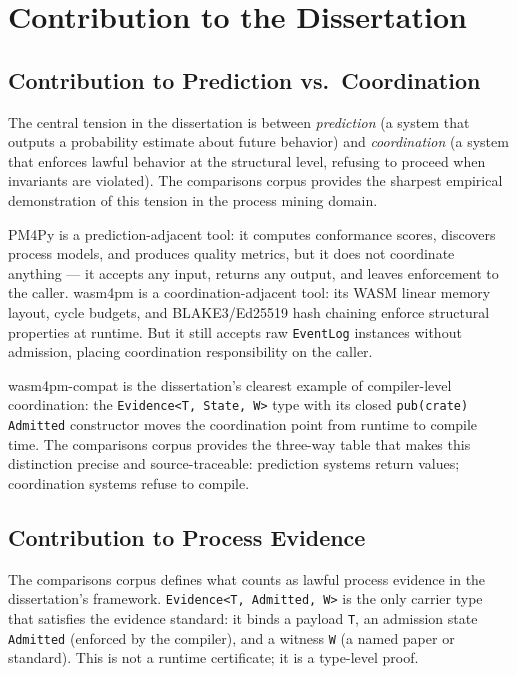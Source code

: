 
\section{Contribution to the Dissertation}
\label{sec:comparisons-contribution}

\subsection{Contribution to Prediction vs.~Coordination}
\label{sec:comparisons-contribution-prediction}

The central tension in the dissertation is between \emph{prediction} (a system
that outputs a probability estimate about future behavior) and
\emph{coordination} (a system that enforces lawful behavior at the structural
level, refusing to proceed when invariants are violated). The comparisons corpus
provides the sharpest empirical demonstration of this tension in the process
mining domain.

PM4Py is a prediction-adjacent tool: it computes conformance scores, discovers
process models, and produces quality metrics, but it does not coordinate anything
--- it accepts any input, returns any output, and leaves enforcement to the caller.
wasm4pm is a coordination-adjacent tool: its WASM linear memory layout, cycle
budgets, and BLAKE3/Ed25519 hash chaining enforce structural properties at
runtime. But it still accepts raw \texttt{EventLog} instances without admission,
placing coordination responsibility on the caller.

wasm4pm-compat is the dissertation's clearest example of compiler-level
coordination: the \texttt{Evidence<T, State, W>} type with its closed
\texttt{pub(crate)} \texttt{Admitted} constructor moves the coordination point
from runtime to compile time. The comparisons corpus provides the three-way
table that makes this distinction precise and source-traceable: prediction
systems return values; coordination systems refuse to compile.

\subsection{Contribution to Process Evidence}
\label{sec:comparisons-contribution-evidence}

The comparisons corpus defines what counts as lawful process evidence in the
dissertation's framework. \texttt{Evidence<T, Admitted, W>} is the only carrier
type that satisfies the evidence standard: it binds a payload \texttt{T}, an
admission state \texttt{Admitted} (enforced by the compiler), and a witness
\texttt{W} (a named paper or standard). This is not a runtime certificate; it
is a type-level proof.


